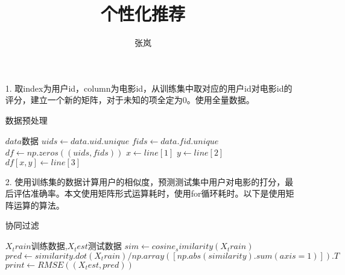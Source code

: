\documentclass[12pt]{article}
\title{个性化推荐}
\author{张岚}
\begin{document}
\maketitle

\begin{enumerate}
\item[1.] 取index为用户id，column为电影id，从训练集中取对应的用户id对电影id的评分，建立一个新的矩阵，对于未知的项全定为0。使用全量数据。

 \begin{algorithm}
        \caption{数据预处理}
        \begin{algorithmic}[1] %
            \Require $data$数据
                \State $uids \gets data.uid.unique$
                \State $fids \gets data.fid.unique$
                \State $df \gets np.zeros((uids,fids))$
                	    \State $x \gets line[1]$
	    	    \State $y \gets line[2]$
                     \State $df[x,y]  \gets line[3]$
                \EndFor
                \State {}
            \EndFunction    
        \end{algorithmic}
\end{algorithm}

\item[2.] 使用训练集的数据计算用户的相似度，预测测试集中用户对电影的打分，最后评估准确率。本文使用矩阵形式运算耗时，使用for循环耗时。以下是使用矩阵运算的算法。
 \begin{algorithm}
        \caption{协同过滤}
        \begin{algorithmic}[1] %
            \Require $X_train$训练数据,$X_test$测试数据
                \State $sim \gets cosine_similarity(X_train)$
                \State $pred \gets similarity.dot(X_train) / np.array([np.abs(similarity).sum(axis=1)]).T$
                \State $print  \gets RMSE((X_test,pred))$
            \EndFunction    
        \end{algorithmic}
\end{algorithm}

\end{enumerate}
\end{document}
